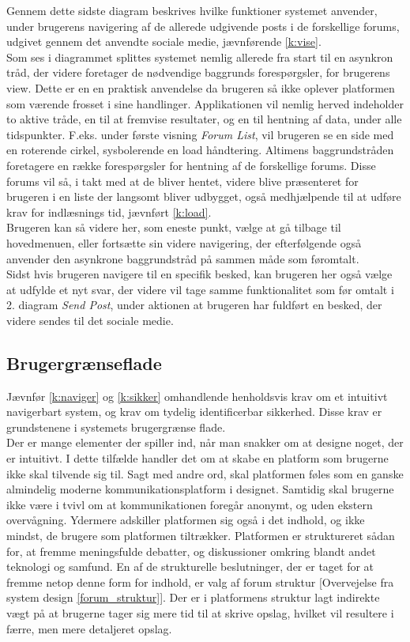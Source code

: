 
Gennem dette sidste diagram beskrives hvilke funktioner systemet anvender, under brugerens navigering af de allerede udgivende posts i de forskellige forums, udgivet gennem det anvendte sociale medie, jævnførende \ref{k:vise}.\\
Som ses i diagrammet splittes systemet nemlig allerede fra start til en asynkron tråd, der videre foretager de nødvendige baggrunds forespørgsler, for brugerens view. Dette er en en praktisk anvendelse da brugeren så ikke oplever platformen som værende frosset i sine handlinger. Applikationen vil nemlig herved indeholder to aktive tråde, en til at fremvise resultater, og en til hentning af data, under alle tidspunkter.
F.eks. under første visning \textit{Forum List}, vil brugeren se en side med en roterende cirkel, sysbolerende en load håndtering. Altimens baggrundstråden foretagere en række forespørgsler for hentning af de forskellige forums. Disse forums vil så, i takt med at de bliver hentet, videre blive præsenteret for brugeren i en liste der langsomt bliver udbygget, også medhjælpende til at udføre krav for indlæsnings tid, jævnført \ref{k:load}.\\
Brugeren kan så videre her, som eneste punkt, vælge at gå tilbage til hovedmenuen, eller fortsætte sin videre navigering, der efterfølgende også anvender den asynkrone baggrundstråd på sammen måde som føromtalt.\\
Sidst hvis brugeren navigere til en specifik besked, kan brugeren her også vælge at udfylde et nyt svar, der videre vil tage samme funktionalitet som før omtalt i 2. diagram \textit{Send Post}, under aktionen at brugeren har fuldført en besked, der videre sendes til det sociale medie.

\subsection{Brugergrænseflade}
\label{brugerflade}
Jævnfør \ref{k:naviger} og \ref{k:sikker} omhandlende henholdsvis krav om et intuitivt navigerbart system, og krav om tydelig identificerbar sikkerhed. Disse krav er grundstenene i systemets brugergrænse flade.\\
Der er mange elementer der spiller ind, når man snakker om at designe noget, der er intuitivt. I dette tilfælde handler det om at skabe en platform som brugerne ikke skal tilvende sig til. Sagt med andre ord, skal platformen føles som en ganske almindelig moderne kommunikationsplatform i designet. Samtidig skal brugerne ikke være i tvivl om at kommunikationen foregår anonymt, og uden ekstern overvågning. Ydermere adskiller platformen sig også i det indhold, og ikke mindst, de brugere som platformen tiltrækker. Platformen er struktureret sådan for, at fremme meningsfulde debatter, og diskussioner omkring blandt andet teknologi og samfund. En af de strukturelle beslutninger, der er taget for at fremme netop denne form for indhold, er valg af forum struktur [Overvejelse fra system design \ref{forum_struktur}]. Der er i platformens struktur lagt indirekte vægt på at brugerne tager sig mere tid til at skrive opslag, hvilket vil resultere i færre, men mere detaljeret opslag.

